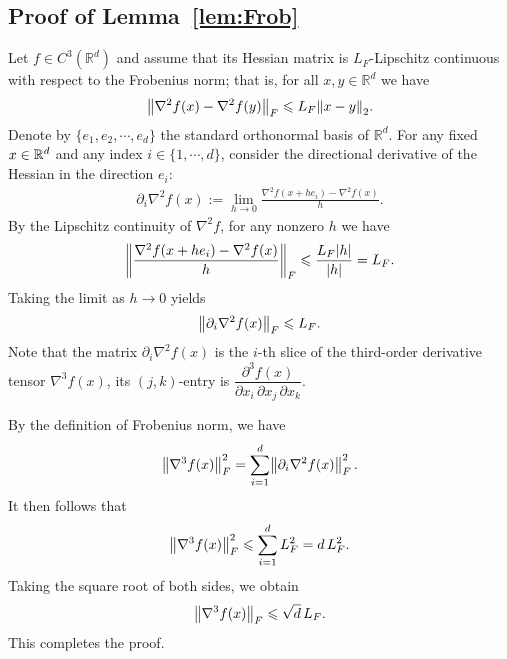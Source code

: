 \subsection{Proof of Lemma~\ref{lem:Frob}}
Let $f \in C^3(\mathbb{R}^d)$ and assume that its Hessian matrix is $L_F$-Lipschitz continuous with respect to the Frobenius norm; that is, for all $x,y \in \mathbb{R}^d$ we have
\begin{align*}
    \l|\nabla^2 f(x) - \nabla^2 f(y)\r|_F \leqslant L_F \l|x-y\r|_2.
\end{align*}
Denote by $\{e_1, e_2, \cdots, e_d\}$ the standard orthonormal basis of $\mathbb{R}^d$. For any fixed $x \in \mathbb{R}^d$ and any index $i \in \{1,\cdots,d\}$, consider the directional derivative of the Hessian in the direction $e_i$:
\begin{align*}
    \partial_i \nabla^2 f(x) := \lim_{h \to 0} \frac{\nabla^2 f(x+he_i) - \nabla^2 f(x)}{h}.
\end{align*}
By the Lipschitz continuity of $\nabla^2 f$, for any nonzero $h$ we have
\begin{align*}
\l|\dfrac{\nabla^2 f(x+he_i) - \nabla^2 f(x)}{h}\r|_F \leqslant \dfrac{L_F |h|}{|h|} = L_F.
\end{align*}
Taking the limit as $h \to 0$ yields
\begin{align*}
    \l|\partial_i \nabla^2 f(x)\r|_F \leqslant L_F.
\end{align*}
Note that the matrix $\partial_i \nabla^2 f(x)$ is the $i$-th slice of the third-order derivative tensor $\nabla^3 f(x)$, its $(j,k)$-entry is $\dfrac{\partial^3 f(x)}{\partial x_i\,\partial x_j\,\partial x_k}$.

By the definition of Frobenius norm, we have
\begin{align*}
    \l|\nabla^3 f(x)\r|_F^2 = \sum_{i=1}^d \l|\partial_i \nabla^2 f(x)\r|_F^2\,.
\end{align*}
It then follows that
\begin{align*}
\l|\nabla^3 f(x)\r|_F^2 \leqslant \sum_{i=1}^d L_F^2 = d\,L_F^2.
\end{align*}
Taking the square root of both sides, we obtain
\begin{align*}
\l|\nabla^3 f(x)\r|_F \leqslant \sqrt{d}\, L_F.
\end{align*}
This completes the proof.

